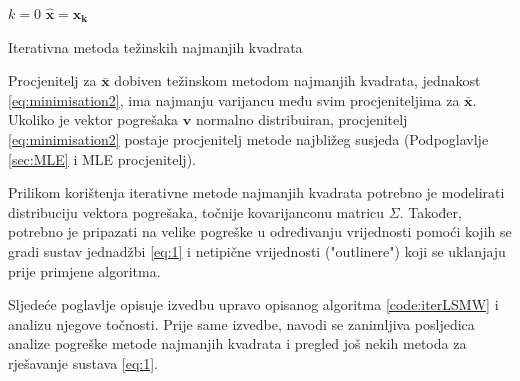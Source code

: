 \documentclass[a4paper,twoside,12pt]{memoir} %
\begin{document}
\begin{algorithm}[H]
	$k = 0$ \;
	$\hat{\mathbf{x}} = \mathbf{x_k}$
	\caption{Iterativna metoda težinskih najmanjih kvadrata}
	\label{code:iterLSMW}
\end{algorithm}
Procjenitelj za $\bar{\mathbf{x}}$ dobiven težinskom metodom najmanjih kvadrata, jednakost \ref{eq:minimisation2}, ima najmanju varijancu među svim procjeniteljima za
$\bar{\mathbf{x}}$. Ukoliko je vektor pogrešaka $\mathbf{v}$ normalno
distribuiran, procjenitelj \ref{eq:minimisation2} postaje procjenitelj
metode najbližeg susjeda (Podpoglavlje \ref{sec:MLE} i MLE procjenitelj).

Prilikom korištenja iterativne metode najmanjih kvadrata potrebno je
modelirati distribuciju vektora pogrešaka, točnije kovarijanconu matricu $\Sigma$.
Također, potrebno je pripazati na 
velike pogreške u određivanju vrijednosti pomoći kojih se gradi sustav jednadžbi 
\ref{eq:1} i netipične vrijednosti ("outlinere") koji se uklanjaju prije primjene algoritma.

Sljedeće poglavlje opisuje izvedbu upravo opisanog algoritma \ref{code:iterLSMW} i 
analizu njegove točnosti. Prije same izvedbe, navodi se zanimljiva posljedica
analize pogreške metode najmanjih kvadrata i pregled još nekih metoda za rješavanje
sustava \ref{eq:1}.
\end{document}
